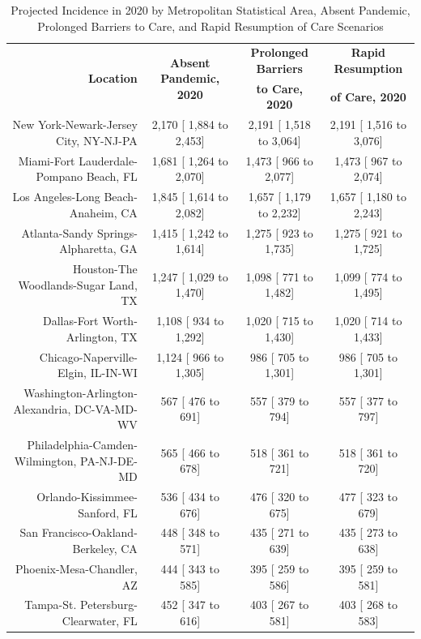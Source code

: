 \documentclass{article}
\begin{document}
\begin{table}[H]
	\caption{Projected Incidence in 2020 by Metropolitan Statistical Area, Absent Pandemic, Prolonged Barriers to Care, and Rapid Resumption of Care Scenarios}
	\footnotesize
	\begin{tabular}{|r|c|c|c|}
		\hline
		\multirow{2}{*}{\textbf{Location}} & \multirow{2}{*}{\textbf{Absent Pandemic, 2020}} & \textbf{Prolonged Barriers} & \textbf{Rapid Resumption}\\
		&  & \textbf{to Care, 2020} & \textbf{of Care, 2020}\\
		\hline\hline
		New York-Newark-Jersey City, NY-NJ-PA &  2,170 [ 1,884 to  2,453] &  2,191 [ 1,518 to  3,064] &  2,191 [ 1,516 to  3,076]\\
		Miami-Fort Lauderdale-Pompano Beach, FL &  1,681 [ 1,264 to  2,070] &  1,473 [   966 to  2,077] &  1,473 [   967 to  2,074]\\
		Los Angeles-Long Beach-Anaheim, CA &  1,845 [ 1,614 to  2,082] &  1,657 [ 1,179 to  2,232] &  1,657 [ 1,180 to  2,243]\\
		Atlanta-Sandy Springs-Alpharetta, GA &  1,415 [ 1,242 to  1,614] &  1,275 [   923 to  1,735] &  1,275 [   921 to  1,725]\\
		Houston-The Woodlands-Sugar Land, TX &  1,247 [ 1,029 to  1,470] &  1,098 [   771 to  1,482] &  1,099 [   774 to  1,495]\\
		Dallas-Fort Worth-Arlington, TX &  1,108 [   934 to  1,292] &  1,020 [   715 to  1,430] &  1,020 [   714 to  1,433]\\
		Chicago-Naperville-Elgin, IL-IN-WI &  1,124 [   966 to  1,305] &    986 [   705 to  1,301] &    986 [   705 to  1,301]\\
		Washington-Arlington-Alexandria, DC-VA-MD-WV &    567 [   476 to    691] &    557 [   379 to    794] &    557 [   377 to    797]\\
		Philadelphia-Camden-Wilmington, PA-NJ-DE-MD &    565 [   466 to    678] &    518 [   361 to    721] &    518 [   361 to    720]\\
		Orlando-Kissimmee-Sanford, FL &    536 [   434 to    676] &    476 [   320 to    675] &    477 [   323 to    679]\\
		San Francisco-Oakland-Berkeley, CA &    448 [   348 to    571] &    435 [   271 to    639] &    435 [   273 to    638]\\
		Phoenix-Mesa-Chandler, AZ &    444 [   343 to    585] &    395 [   259 to    586] &    395 [   259 to    581]\\
		Tampa-St. Petersburg-Clearwater, FL &    452 [   347 to    616] &    403 [   267 to    581] &    403 [   268 to    583]\\

\end{tabular}
\end{table}
\end{document}
